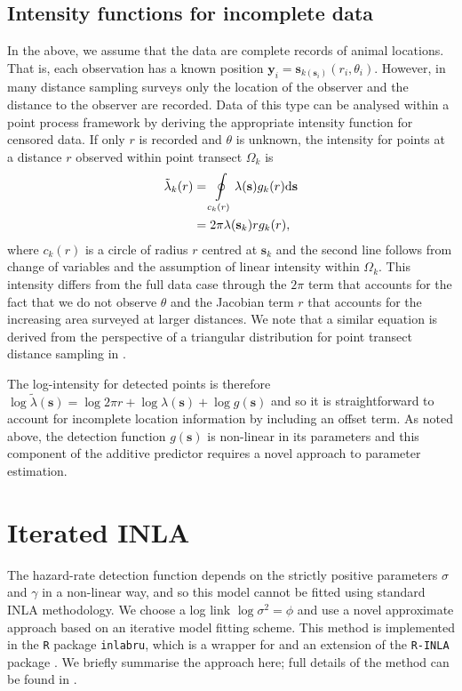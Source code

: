 \documentclass{statsoc}
\newcommand{\bs}{\mathbf{s}}
\newcommand{\bm}{\boldsymbol}  %
\newcommand{\tl}{\tilde{\lambda}}   %
\begin{document}
\subsection{Intensity functions for incomplete data}

In the above, we assume that the data are complete records of animal locations.  That is, each observation has a known position $\bm{y}_i = \bs_{k(\bs_i)}(r_i, \theta_i)$.  However, in many distance sampling surveys only the location of the observer and the distance to the observer are recorded.  Data of this type can be analysed within a point process framework by deriving the appropriate intensity function for censored data. If only $r$ is recorded and $\theta$ is unknown, the intensity for points at a distance $r$ observed within point transect $\Omega_k$ is
\begin{align}
\label{intensity-incomplete}
\tl_k(r) &= \oint\displaylimits_{c_k(r)} \lambda(\bs)g_k(r)\mathrm{d}\bs \nonumber \\
&= 2\pi\lambda(\bs_k)rg_k(r),
\end{align}
where $c_k(r)$ is a circle of radius $r$ centred at $\bs_k$ and the second line follows from change of variables and the assumption of linear intensity within $\Omega_k$.  This intensity differs from the full data case through the $2\pi$  term that accounts for the fact that we do not observe $\theta$ and the Jacobian term $r$ that accounts for the increasing area surveyed at larger distances.  We note that a similar equation is derived from the perspective of a triangular distribution for point transect distance sampling in \cite{buckland_advanced_2004}.

The log-intensity for detected points is therefore $\log\tl(\bs) = \log 2 \pi r + \log\lambda(\bs) + \log g(\bs)$ and so it is straightforward to account for incomplete location information by including an offset term.  As noted above, the detection function $g(\bs)$ is non-linear in its parameters and this component of the additive predictor requires a novel approach to parameter estimation.

\section{Iterated INLA}
\label{sec-iinla}

The hazard-rate detection function depends on the strictly positive parameters $\sigma$ and $\gamma$ in a non-linear way, and so this model cannot be fitted using standard INLA methodology.  We choose a log link $\log\sigma^2 = \phi$ and use a novel approximate approach based on an iterative model fitting scheme. This method is implemented in the \texttt{R} package \texttt{inlabru}, which is a wrapper for and an extension of the \texttt{R-INLA} package \citep{lindgren_inlabru_2024}. We briefly summarise the approach here; full details of the method can be found in \cite{lindgren_inlabru_2024}.
\end{document}
